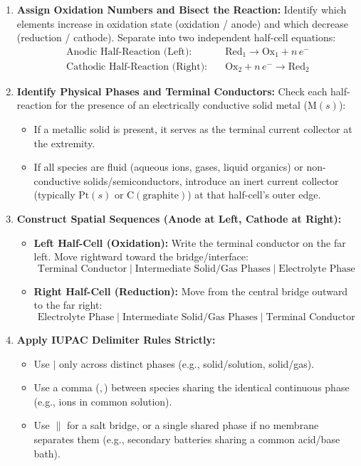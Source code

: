 \documentclass[10pt,a4paper]{article}
\begin{document}
\begin{enumerate}[leftmargin=*]
    \item \textbf{Assign Oxidation Numbers and Bisect the Reaction:}
    Identify which elements increase in oxidation state (oxidation / anode) and which decrease (reduction / cathode). Separate into two independent half-cell equations:
    \begin{align*}
        \text{Anodic Half-Reaction (Left):} \quad & \text{Red}_1 \longrightarrow \text{Ox}_1 + n\,e^- \\
        \text{Cathodic Half-Reaction (Right):} \quad & \text{Ox}_2 + n\,e^- \longrightarrow \text{Red}_2
    \end{align*}
    
    \item \textbf{Identify Physical Phases and Terminal Conductors:}
    Check each half-reaction for the presence of an electrically conductive solid metal ($\text{M}(s)$):
    \begin{itemize}
        \item If a metallic solid is present, it serves as the terminal current collector at the extremity.
        \item If all species are fluid (aqueous ions, gases, liquid organics) or non-conductive solids/semiconductors, introduce an inert current collector (typically $\text{Pt}(s)$ or $\text{C}(\text{graphite})$) at that half-cell's outer edge.
    \end{itemize}

    \item \textbf{Construct Spatial Sequences (Anode at Left, Cathode at Right):}
    \begin{itemize}
        \item \textbf{Left Half-Cell (Oxidation):} Write the terminal conductor on the far left. Move rightward toward the bridge/interface:
        $$\text{Terminal Conductor} \mid \text{Intermediate Solid/Gas Phases} \mid \text{Electrolyte Phase}$$
        \item \textbf{Right Half-Cell (Reduction):} Move from the central bridge outward to the far right:
        $$\text{Electrolyte Phase} \mid \text{Intermediate Solid/Gas Phases} \mid \text{Terminal Conductor}$$
    \end{itemize}

    \item \textbf{Apply IUPAC Delimiter Rules Strictly:}
    \begin{itemize}
        \item Use $\mid$ only across distinct phases (e.g., solid/solution, solid/gas).
        \item Use a comma ($,$) between species sharing the identical continuous phase (e.g., ions in common solution).
        \item Use $\parallel$ for a salt bridge, or a single shared phase if no membrane separates them (e.g., secondary batteries sharing a common acid/base bath).
    \end{itemize}
\end{enumerate}
\end{document}
